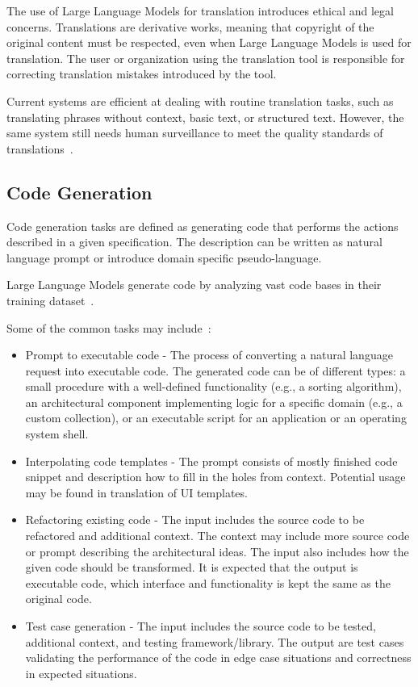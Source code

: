 The use of Large Language Models for translation introduces ethical and legal concerns.
Translations are derivative works, meaning that copyright of the original content must be respected,
even when Large Language Models is used for translation.
The user or organization using the translation tool is responsible for correcting translation mistakes introduced by the tool.

Current systems are efficient at dealing with routine translation tasks, such as translating phrases without context,
basic text, or structured text.
However, the same system still needs human surveillance to meet the quality standards of translations~\parencite[AI vs. Human Translators: Can AI Replace Them?]{ablaikhan_translation_ai}.

\subsection{Code Generation}\label{subsec:code-generation}
Code generation tasks are defined as generating code that performs the actions described in a given specification.
The description can be written as natural language prompt or introduce domain specific pseudo-language.

Large Language Models generate code by analyzing vast code bases in their training dataset~\parencite[AI Models and Techniques for Code Generation]{khade2025review_of_llm_code}.

Some of the common tasks may include~\parencite[Introduction]{chen2024survey_codellm}:

\begin{itemize}
    \item Prompt to executable code - The process of converting a natural language request into executable code.
        The generated code can be of different types: a small procedure with a well-defined functionality (e.g., a sorting algorithm),
        an architectural component implementing logic for a specific domain (e.g., a custom collection),
        or an executable script for an application or an operating system shell.
    \item Interpolating code templates - The prompt consists of mostly finished code snippet and description how to fill
        in the holes from context.
        Potential usage may be found in translation of UI templates.
    \item Refactoring existing code - The input includes the source code to be refactored and additional context.
        The context may include more source code or prompt describing the architectural ideas.
        The input also includes how the given code should be transformed.
        It is expected that the output is executable code, which interface and functionality is kept the same as the original code.
    \item Test case generation - The input includes the source code to be tested, additional context, and testing framework/library.
        The output are test cases validating the performance of the code in edge case situations and correctness in expected situations.
\end{itemize}

